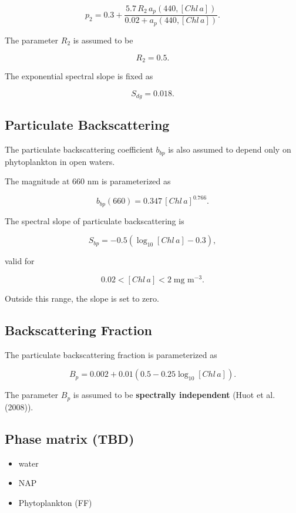\documentclass[
  letterpaper,
]{scrbook}
\providecommand{\tightlist}{%
  \setlength{\itemsep}{0pt}\setlength{\parskip}{0pt}}
\begin{document}
\[
p_2 = 0.3 + \frac{5.7\,R_2\,a_p(440,[Chl\,a])}{0.02 + a_p(440,[Chl\,a])}.
\]

The parameter \(R_2\) is assumed to be

\[
R_2 = 0.5.
\]

The exponential spectral slope is fixed as

\[
S_{dg} = 0.018.
\]

\subsection{Particulate
Backscattering}\label{particulate-backscattering}

The particulate backscattering coefficient \(b_{bp}\) is also assumed to
depend only on phytoplankton in open waters.

The magnitude at 660 nm is parameterized as

\[
b_{bp}(660) = 0.347\,[Chl\,a]^{0.766}.
\]

The spectral slope of particulate backscattering is

\[
S_{bp} = -0.5\left(\log_{10}[Chl\,a] - 0.3\right),
\]

valid for

\[
0.02 < [Chl\,a] < 2 \; \text{mg m}^{-3}.
\]

Outside this range, the slope is set to zero.

\subsection{Backscattering Fraction}\label{backscattering-fraction}

The particulate backscattering fraction is parameterized as

\[
B_p = 0.002 + 0.01\left(0.5 - 0.25\log_{10}[Chl\,a]\right).
\]

The parameter \(B_p\) is assumed to be \textbf{spectrally independent}
(Huot et al. (2008)).

\subsection{Phase matrix (TBD)}\label{phase-matrix-tbd}

\begin{itemize}
\tightlist
\item
  water
\item
  NAP
\item
  Phytoplankton (FF)
\end{itemize}
\end{document}
